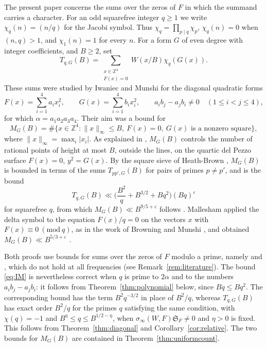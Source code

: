 \documentclass[11pt]{amsart}
\numberwithin{equation}{section}
\numberwithin{figure}{section}
\theoremstyle{definition}
\newcommand{\Z}{\mathbb{Z}}
\newcommand{\F}{\mathcal{F}}
\newcommand{\imod}[1]{\ (\mathrm{mod}\ #1)}
\renewcommand{\S}{\mathfrak{S}}
\newcommand{\eps}{\varepsilon}
\newcommand{\abs}[1]{\lvert #1\rvert}
\begin{document}
The present paper concerns the sums over the zeros of $F$ in which
the summand carries a character. For an odd squarefree integer
$q\ge1$ we write $\chi_q(n)=(n/q)$ for the Jacobi symbol. Thus
$\chi_q=\prod_{p\mid q}\chi_p$, $\chi_q(n)=0$ when $(n,q)>1$, and
$\chi_1(n)=1$ for every $n$. For a form $G$ of even degree with
integer coefficients, and $B\ge2$, set
\begin{equation}\label{eq:Tdef}
 T_{q,G}(B)=\sum_{\substack{x\in\Z^4\\F(x)=0}}W(x/B)\chi_q(G(x)).
\end{equation}
These sums were studied by Iwaniec and Munshi \cite{IM} for the
diagonal quadratic forms
\begin{equation}\label{eq:diagonal}
 F(x)=\sum_{i=1}^4a_ix_i^2,\qquad G(x)=\sum_{i=1}^4b_ix_i^2,
 \qquad a_ib_j-a_jb_i\ne0\quad(1\le i<j\le4),
\end{equation}
for which $\alpha=a_1a_2a_3a_4$. Their aim was a bound for
\begin{equation}\label{eq:MG}
 M_G(B)=\#\{x\in\Z^4:\lVert x\rVert_\infty\le B,\ F(x)=0,\
 G(x)\text{ is a nonzero square}\},
\end{equation}
where $\lVert x\rVert_\infty=\max_i\abs{x_i}$. As explained in
\cite{IM}, $M_G(B)$ controls the number of rational points of height at
most $B$, outside the lines, on the quartic del Pezzo surface
$F(x)=0$, $y^2=G(x)$. By the square
sieve of Heath-Brown \cite{HB2}, $M_G(B)$ is bounded in terms of the
sums $T_{pp',G}(B)$ for pairs of primes $p\ne p'$, and
\cite[Proposition~2.1]{IM} is the bound
\begin{equation}\label{eq:IM}
 T_{q,G}(B)\ll\Big(\frac{B^2}q+B^{3/2}+Bq^2\Big)(Bq)^\eps
\end{equation}
for squarefree $q$, from which $M_G(B)\ll B^{9/5+\eps}$ follows
\cite[Theorem~1.1]{IM}. Mallesham \cite{M} applied the delta symbol
to the equation $F(x)/q=0$ on the vectors $x$ with
$F(x)\equiv0\imod q$, as in the work of Browning and Munshi
\cite{BM}, and obtained $M_G(B)\ll B^{5/3+\eps}$
\cite[Theorem~1.3]{M}.

Both proofs use bounds for sums over the zeros of $F$ modulo a
prime, namely \cite[Lemma~4.6]{IM} and \cite[Lemmas~5.3 and~5.4]{M},
which do not hold at all frequencies (see
Remark~\ref{rem:literature}). The bound \eqref{eq:IM} is nevertheless
correct when $q$ is prime to $2\alpha$ and to the numbers
$a_ib_j-a_jb_i$: it follows from Theorem~\ref{thm:polynomial} below,
since $Bq\le Bq^2$. The corresponding bound
\cite[Proposition~2.1]{M} has the term $B^2q^{-3/2}$ in place of
$B^2/q$, whereas $T_{q,G}(B)$ has exact order $B^2/q$ for the primes
$q$ satisfying the same condition, with $\chi(q)=-1$ and
$B^\eta\le q\le B^{1/2-\eta}$, when
$\sigma_\infty(W,F)\S_F\ne0$ and $\eta>0$ is fixed. This follows from
Theorem~\ref{thm:diagonal} and Corollary~\ref{cor:relative}. The two
bounds for $M_G(B)$ are contained in
Theorem~\ref{thm:uniformcount}.
\end{document}
